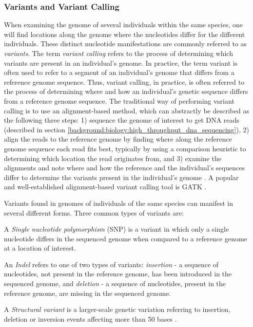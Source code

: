 \subsubsection{Variants and Variant Calling} \label{background:biology:variants_and_variant_calling}
When examining the genome of several individuals within the same species, one will find locations along the genome where the nucleotides differ for the different individuals.
These distinct nucleotide manifestations are commonly referred to as \textit{variants}.
The term \textit{variant calling} refers to the process of determining which variants are present in an individual's genome.
In practice, the term variant is often used to refer to a segment of an individual's genome that differs from a reference genome sequence.
Thus, variant calling, in practice, is often referred to the process of determining where and how an individual's genetic sequence differs from a reference genome sequence.
The traditional way of performing variant calling is to use an alignment-based method, which can abstractly be described as the following three steps:
1) sequence the genome of interest to get DNA reads (described in section \ref{background:biology:high_throughput_dna_sequencing}), 
2) align the reads to the reference genome by finding where along the reference genome sequence each read fits best, typically by using a comparison heuristic to determining which location the read originates from, and 
3) examine the alignments and note where and how the reference and the individual's sequences differ to determine the variants present in the individual's genome \cite{variant_calling}.
A popular and well-established alignment-based variant calling tool is GATK \cite{gatk}.

Variants found in genomes of individuals of the same species can manifest in several different forms.
Three common types of variants are:
\begin{compactitem}
  \item A \textit{Single nucleotide polymorphism} (SNP) is a variant in which only a single nucleotide differs in the sequenced genome when compared to a reference genome at a location of interest.
  \item An \textit{Indel} refers to one of two types of variants: \textit{insertion} - a sequence of nucleotides, not present in the reference genome, has been introduced in the sequenced genome, and \textit{deletion} - a sequence of nucleotides, present in the reference genome, are missing in the sequenced genome.
  \item A \textit{Structural variant} is a larger-scale genetic variation referring to insertion, deletion or inversion events affecting more than 50 bases \cite{structural_variant_size}.
\end{compactitem}

